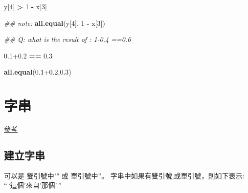 \documentclass[]{book}
\newenvironment{Shaded}{\begin{snugshade}}{\end{snugshade}}
\newcommand{\CommentTok}[1]{\textcolor[rgb]{0.56,0.35,0.01}{\textit{#1}}}
\newcommand{\DecValTok}[1]{\textcolor[rgb]{0.00,0.00,0.81}{#1}}
\newcommand{\FloatTok}[1]{\textcolor[rgb]{0.00,0.00,0.81}{#1}}
\newcommand{\KeywordTok}[1]{\textcolor[rgb]{0.13,0.29,0.53}{\textbf{#1}}}
\newcommand{\NormalTok}[1]{#1}
\newcommand{\OperatorTok}[1]{\textcolor[rgb]{0.81,0.36,0.00}{\textbf{#1}}}
\newcommand{\StringTok}[1]{\textcolor[rgb]{0.31,0.60,0.02}{#1}}
\theoremstyle{definition}
\theoremstyle{definition}
\theoremstyle{definition}
\theoremstyle{remark}
\begin{document}
\begin{Shaded}
\begin{Highlighting}[]
\NormalTok{y[}\DecValTok{4}\NormalTok{] }\OperatorTok{>}\StringTok{ }\DecValTok{1} \OperatorTok{-}\StringTok{ }\NormalTok{x[}\DecValTok{3}\NormalTok{]}
\end{Highlighting}
\end{Shaded}

\begin{Shaded}
\begin{Highlighting}[]
\CommentTok{## note:}
\KeywordTok{all.equal}\NormalTok{(y[}\DecValTok{4}\NormalTok{], }\DecValTok{1} \OperatorTok{-}\StringTok{ }\NormalTok{x[}\DecValTok{3}\NormalTok{])}
\end{Highlighting}
\end{Shaded}

\begin{Shaded}
\begin{Highlighting}[]
\CommentTok{## Q: what is the result of : 1-0.4 ==0.6}
\end{Highlighting}
\end{Shaded}

\begin{Shaded}
\begin{Highlighting}[]
\FloatTok{0.1+0.2} \OperatorTok{==}\StringTok{ }\FloatTok{0.3}
\end{Highlighting}
\end{Shaded}

\begin{Shaded}
\begin{Highlighting}[]
\KeywordTok{all.equal}\NormalTok{(}\FloatTok{0.1+0.2}\NormalTok{,}\FloatTok{0.3}\NormalTok{)}
\end{Highlighting}
\end{Shaded}

\section{字串}

\href{https://www.gastonsanchez.com/r4strings/chars.html}{參考}

\subsection{建立字串}

可以是 雙引號中"" 或 單引號中''。
字串中如果有雙引號,或單引號，則如下表示:\\
``\,`這個'來自'那個'\,''
\end{document}
